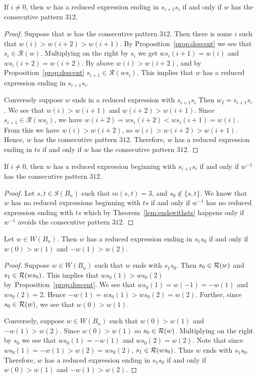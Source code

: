\begin{lemma}\label{lem:st}
If $i \neq 0$, then $w$ has a reduced expression ending in $s_{i+1}s_i$ if and only if $w$ has the consecutive pattern $312$.
\begin{proof}
	Suppose that $w$ has the consecutive pattern $312$.  Then there is some $i$ such that $w(i)>w(i+2)>w(i+1)$. By Proposition~\ref{prop:descent} we see that $s_i \in \mathcal{R}(w)$. Multiplying on the right by $s_i$ we get $ws_i(i+1)=w(i)$ and $ws_i(i+2)=w(i+2)$. By above $w(i)>w(i+2)$, and by Proposition~\ref{prop:descent} $s_{i+1} \in \mathcal{R}(ws_i)$. This implies that $w$ has a reduced expression ending in $s_{i+1}s_i$. 
	
	Conversely suppose $w$ ends in a reduced expression with $s_{i+1}s_i$ Then $w_I=s_{i+1}s_i$. We see that $w(i)>w(i+1)$ and $w(i+2)>w(i+1)$. Since $s_{i+1} \in \mathcal{R}(ws_i)$, we have $w(i+2)=ws_i(i+2)<ws_i(i+1)=w(i)$. From this we have $w(i)>w(i+2)$, so $w(i)>w(i+2)>w(i+1)$. Hence, $w$ has the consecutive pattern $312$. Therefore, $w$ has a reduced expression ending in $ts$ if and only if $w$ has the consecutive pattern $312$.
\end{proof}
\end{lemma}

\begin{corollary}\label{lem:endswithts}
	If $i \neq 0$, then $w$ has a reduced expression beginning with $s_{i+1}s_i$ if and only if $w^{-1}$ has the consecutive pattern $312$.
	\begin{proof}
		Let $s,t \in S(B_n)$ such that $m(s,t)=3$, and $s_0 \notin\{s,t\}$. We know that $w$ has no reduced expressions beginning with $ts$ if and only if $w^{-1}$ has no reduced expression ending with $ts$ which by Theorem~\ref{lem:endswithsts} happens only if $w^{-1}$ avoids the consecutive pattern $312.$
	\end{proof}
\end{corollary}

\begin{lemma}\label{lem:endswiths0}
Let $w \in W(B_n)$. Then $w$ has a reduced expression ending in $s_1s_0$ if and only if $w(0)>w(1)$ and $-w(1)>w(2)$.
\begin{proof}
	Suppose $w \in W(B_n)$ such that $w$ ends with $s_1s_0$. Then $s_0 \in \mathcal{R}(w)$ and $s_1 \in \mathcal{R}(ws_0)$. This implies that $ws_0(1)>ws_0(2)$ by~Proposition~\ref{prop:descent}. We see that $ws_0(1)=w(-1)=-w(1)$ and $ws_0(2)=2$. Hence $-w(1)=ws_0(1)>ws_0(2)=w(2)$. Further, since $s_0 \in \mathcal{R}(w)$, we see that $w(0)>w(1)$.
	
	Conversely, suppose $w \in W(B_n)$ such that $w(0)>w(1)$ and $-w(1)>w(2)$. Since $w(0)>w(1)$ so $s_0 \in \mathcal{R}(w)$. Multiplying on the right by $s_0$ we see that $ws_0(1)=-w(1)$ and $ws_0(2)=w(2)$. Note that since $ws_0(1)=-w(1)>w(2)=ws_0(2)$, $s_1 \in \mathcal{R}(ws_0)$. Thus $w$ ends with $s_1s_0$. Therefore, $w$ has a reduced expression ending in $s_1s_0$ if and only if $w(0)>w(1)$ and $-w(1)>w(2)$.
\end{proof}
\end{lemma}

